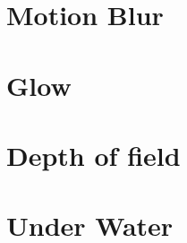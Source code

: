 










\section{Motion Blur}



\section{Glow}



\section{Depth of field}


\section{Under Water}




